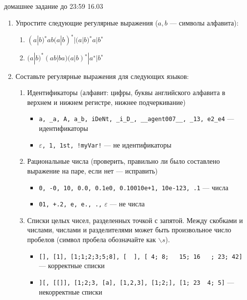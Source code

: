 \documentclass[12pt]{article}
\begin{document}

{\Large домашнее задание до 23:59 16.03}
\bigskip

\begin{enumerate}
  \item 
  { Упростите следующие регулярные выражения ($a, b$ --- символы алфавита): 
    \begin{enumerate} 
      \item { $ (a | b)^{∗} ab (a | b)^{∗} | (a | b)^{∗} a | b^{∗} $ }
      \item { $ (a | b)^{*} (ab | ba) (a | b)^{∗} | a^{∗} | b^{∗} $ }
    \end{enumerate}
  }
  
  \item
  { Составьте регулярные выражения для следующих языков: 
    \begin{enumerate}
      \item 
      { Идентификаторы (алфавит: цифры, буквы английского алфавита в верхнем и нижнем регистре, нижнее подчеркивание)
        \begin{itemize}
          \item \verb;a, _a, A, a_b, iDeNt, _i_D_, __agent007__, _13, e2_e4; --- идентификаторы
          \item $\varepsilon$\verb;, 1, 1st, !myVar!; --- не идентификаторы
        \end{itemize}
      }
      \item 
      { Рациональные числа (проверить, правильно ли было составлено выражение на паре, если нет --- исправить) 
        \begin{itemize} 
          \item \verb;0, -0, 10, 0.0, 0.1e0, 0.10010e+1, 10e-123, .1; --- числа
          \item \verb;01, +.2, e, e., .,; $\varepsilon$ --- не числа
        \end{itemize}
      }
      \item
      { Списки целых чисел, разделенных точкой с запятой. Между скобками и числами, числами и разделителями может быть произвольное число пробелов (символ пробела обозначайте как $\backslash s$). 
        \begin{itemize} 
          \item \verb![], [1], [1;1;2;3;5;8], [  ], [ 4; 8;   15; 16   ; 23; 42]! --- корректные списки
          \item \verb!][, [[]], [1;2;3, [a], [1,2,3], [1;2;], [1; 23  4; 5]! --- некорректные списки
        \end{itemize}
      }
    \end{enumerate}
  }


\end{enumerate}
\end{document}
